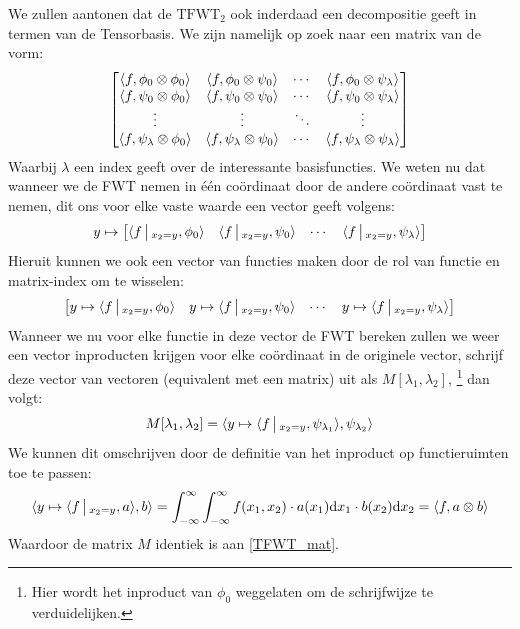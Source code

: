 We zullen aantonen dat de $\mathrm{TFWT}_2$ ook inderdaad een decompositie geeft in termen van de Tensorbasis.
We zijn namelijk op zoek naar een matrix van de vorm:
\begin{equation}
\label{TFWT_mat}
\begin{bmatrix}
\langle f , \phi_0\otimes\phi_0 \rangle     & \langle f , \phi_0\otimes\psi_0 \rangle     & \cdots & \langle f , \phi_0\otimes\psi_\lambda \rangle \\
\langle f , \psi_0\otimes\phi_0 \rangle     & \langle f , \psi_0\otimes\psi_0 \rangle     & \cdots & \langle f , \psi_0\otimes\psi_\lambda \rangle \\ 
           \vdots                 &         \vdots                    & \ddots &                \vdots  \\ 
\langle f , \psi_\lambda\otimes\phi_0 \rangle & \langle f , \psi_\lambda\otimes\psi_0 \rangle 
& \cdots & \langle f , \psi_\lambda\otimes\psi_\lambda \rangle \\
\end{bmatrix}
\end{equation}
Waarbij $\lambda$ een index geeft over de interessante basisfuncties.
We weten nu dat wanneer we de FWT nemen in \'e\'en co\"ordinaat door de andere co\"ordinaat vast te nemen,
 dit ons voor elke vaste waarde een vector geeft volgens:
\[
y \mapsto
\begin{bmatrix}
\langle f\,\big|\,_{x_2=y} , \phi_0 \rangle & 
\langle f\,\big|\,_{x_2=y} , \psi_0 \rangle & \cdots & 
\langle f\,\big|\,_{x_2=y} , \psi_\lambda \rangle
\end{bmatrix}
\]
Hieruit kunnen we ook een vector van functies maken door de rol van functie en matrix-index om te wisselen:
\[
\begin{bmatrix}
y \mapsto \langle f\,\big|\,_{x_2=y} , \phi_0 \rangle & 
y \mapsto \langle f\,\big|\,_{x_2=y} , \psi_0 \rangle & \cdots & 
y \mapsto \langle f\,\big|\,_{x_2=y} , \psi_\lambda \rangle
\end{bmatrix}
\]
Wanneer we nu voor elke functie in deze vector de FWT bereken zullen we weer een vector inproducten krijgen
voor elke co\"ordinaat in de originele vector, schrijf deze vector van vectoren (equivalent met een matrix) uit als 
$M[\lambda_1,\lambda_2]$,
\footnote{Hier wordt het inproduct van $\phi_0$ weggelaten om de schrijfwijze te verduidelijken.}
dan volgt:
\[
M[\lambda_1,\lambda_2] = \langle y\mapsto \langle f\,\big|\,_{x_2=y} , \psi_{\lambda_1} \rangle , \psi_{\lambda_2} \rangle
\]
We kunnen dit omschrijven door de definitie van het inproduct op functieruimten toe te passen:
\[
\langle y\mapsto \langle f\,\big|\,_{x_2=y} , a \rangle , b \rangle = 
\int_{-\infty}^\infty\int_{-\infty}^\infty f(x_1,x_2) \cdot a(x_1) {\mathrm{d} x_1} \cdot b(x_2) {\mathrm{d} x_2} = \langle f , a\otimes b \rangle 
\]
Waardoor de matrix $M$ identiek is aan \ref{TFWT_mat}. 

